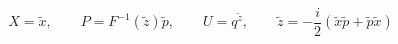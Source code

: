 \begin{equation}
\label{Eq:X-x}
X=\tilde x, \qquad P=F^{-1}(\tilde z) \tilde p, \qquad
U= q^{\tilde z},  \qquad
\tilde z=-\frac{i}{2}(\tilde x\tilde p + \tilde p\tilde x)
\end{equation}

